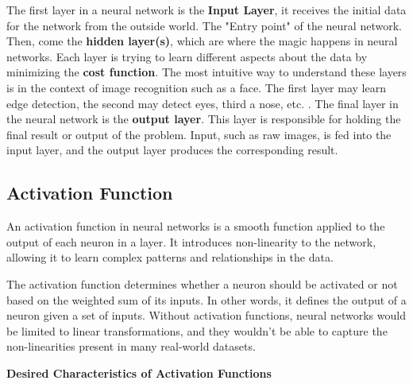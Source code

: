 \documentclass{article}
\begin{document}
The first layer in a neural network is the \textbf{Input Layer}, it receives the initial data for the network from the outside world. The "Entry point" of the neural network. Then, come the \textbf{hidden layer(s)}, which are where the magic happens in neural networks. Each layer is trying to learn different aspects about the data by minimizing the \textbf{cost function}. The most intuitive way to understand these layers is in the context of image recognition such as a face. The first layer may learn edge detection, the second may detect eyes, third a nose, etc. \citep{layers}. The final layer in the neural network is the \textbf{output layer}. This layer is responsible for holding the final result or output of the problem. Input, such as raw images, is fed into the input layer, and the output layer produces the corresponding result.


\subsection{Activation Function}%
  \label{sub:ActivationFunction}
An activation function in neural networks is a smooth function applied to the output of each neuron in a layer. It introduces non-linearity to the network, allowing it to learn complex patterns and relationships in the data.

The activation function determines whether a neuron should be activated or not based on the weighted sum of its inputs. In other words, it defines the output of a neuron given a set of inputs. Without activation functions, neural networks would be limited to linear transformations, and they wouldn't be able to capture the non-linearities present in many real-world datasets. 

\vspace{5mm}
\noindent \textbf{Desired Characteristics of Activation Functions} \citep{jagtap2022important}
\end{document}
